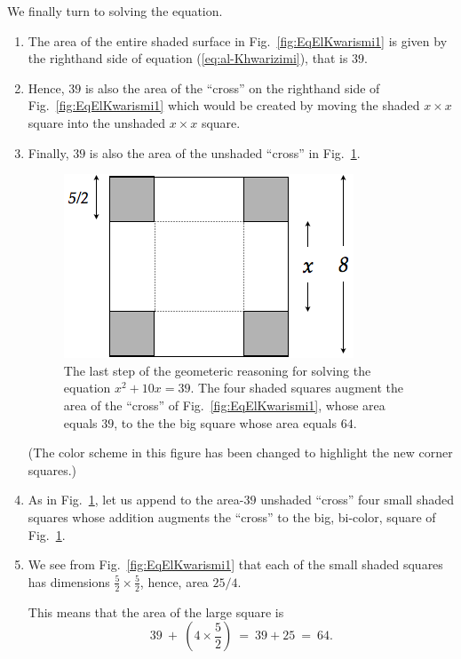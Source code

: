We finally turn to solving the equation.
\begin{enumerate}
\item
The area of the entire shaded surface in Fig.~\ref{fig:EqElKwarismi1} is given by the righthand side of equation (\ref{eq:al-Khwarizimi}), that is $39$.
\medskip\item
Hence, $39$ is also the area of the ``cross'' on the righthand side of Fig.~\ref{fig:EqElKwarismi1} which would be created by moving the shaded $x \times x$ square into the unshaded $x \times x$ square.
\medskip\item
Finally, $39$ is also the area of the unshaded ``cross'' in Fig.~\ref{fig:EqElKwarismi2}.
\begin{figure}[ht]
\begin{center}
       \includegraphics[scale=0.4]{FiguresArithmetic/EquationElKwarismi2}
\caption{The last step of the geometeric reasoning for solving the equation $x^2 + 10x = 39$.  The four shaded squares augment the area of the ``cross'' of Fig.~\ref{fig:EqElKwarismi1}, whose area equals $39$, to the the big square whose area equals $64$.}
       \label{fig:EqElKwarismi2}
\end{center}
\end{figure}
(The color scheme in this figure has been changed to highlight the new corner squares.)

\medskip\item
As in Fig.~\ref{fig:EqElKwarismi2}, let us append to the area-$39$ unshaded ``cross'' four small shaded squares whose addition augments the ``cross'' to the big, bi-color, square of
Fig.~\ref{fig:EqElKwarismi2}.

\medskip\item
We see from Fig.~\ref{fig:EqElKwarismi1} that each of the small shaded squares has dimensions $\frac{5}{2} \times \frac{5}{2}$, hence, area $25/4$.

This means that the area of the large square is
\[ 39 \ + \ \left( 4 \times \frac{5}{2} \right) \ = \ 39 + 25 \ = \ 64. \]
\end{enumerate}

